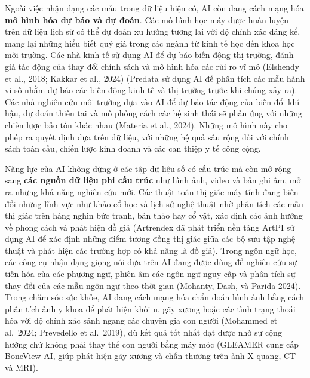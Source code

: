 Ngoài việc nhận dạng các mẫu trong dữ liệu hiện có, AI còn đang cách mạng hóa \textbf{mô hình hóa dự báo và dự đoán}. Các mô hình học máy được huấn luyện trên dữ liệu lịch sử có thể dự đoán xu hướng tương lai với độ chính xác đáng kể, mang lại những hiểu biết quý giá trong các ngành từ kinh tế học đến khoa học môi trường. Các nhà kinh tế sử dụng AI để dự báo biến động thị trường, đánh giá tác động của thay đổi chính sách và mô hình hóa các rủi ro vĩ mô (Elshendy et al., 2018; Kakkar et al., 2024) (Predata sử dụng AI để phân tích các mẫu hành vi số nhằm dự báo các biến động kinh tế và thị trường trước khi chúng xảy ra). Các nhà nghiên cứu môi trường dựa vào AI để dự báo tác động của biến đổi khí hậu, dự đoán thiên tai và mô phỏng cách các hệ sinh thái sẽ phản ứng với những chiến lược bảo tồn khác nhau (Materia et al., 2024). Những mô hình này cho phép ra quyết định dựa trên dữ liệu, với những hệ quả sâu rộng đối với chính sách toàn cầu, chiến lược kinh doanh và các can thiệp y tế công cộng.

Năng lực của AI không dừng ở các tập dữ liệu số có cấu trúc mà còn mở rộng sang \textbf{các nguồn dữ liệu phi cấu trúc} như hình ảnh, video và bản ghi âm, mở ra những khả năng nghiên cứu mới. Các thuật toán thị giác máy tính đang biến đổi những lĩnh vực như khảo cổ học và lịch sử nghệ thuật nhờ phân tích các mẫu thị giác trên hàng nghìn bức tranh, bản thảo hay cổ vật, xác định các ảnh hưởng về phong cách và phát hiện đồ giả (Artrendex đã phát triển nền tảng ArtPI sử dụng AI để xác định những điểm tương đồng thị giác giữa các bộ sưu tập nghệ thuật và phát hiện các trường hợp có khả năng là đồ giả). Trong ngôn ngữ học, các công cụ nhận dạng giọng nói dựa trên AI đang được dùng để nghiên cứu sự tiến hóa của các phương ngữ, phiên âm các ngôn ngữ nguy cấp và phân tích sự thay đổi của các mẫu ngôn ngữ theo thời gian (Mohanty, Dash, và Parida 2024). Trong chăm sóc sức khỏe, AI đang cách mạng hóa chẩn đoán hình ảnh bằng cách phân tích ảnh y khoa để phát hiện khối u, gãy xương hoặc các tình trạng thoái hóa với độ chính xác sánh ngang các chuyên gia con người (Mohammed et al.~2024; Prevedello et al.~2019), dù kết quả tốt nhất đạt được nhờ sự cộng hưởng chứ không phải thay thế con người bằng máy móc (GLEAMER cung cấp BoneView AI, giúp phát hiện gãy xương và chấn thương trên ảnh X-quang, CT và MRI).

